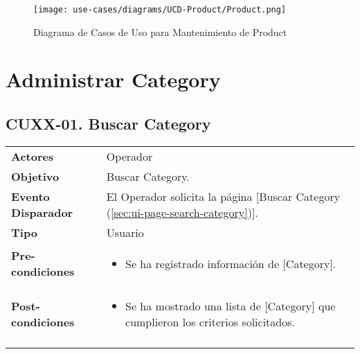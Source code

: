 	\begin{figure}[H]
		\begin{center}
		\label{tab:ucd-entity-product}
		\texttt{[image: use-cases/diagrams/UCD-Product/Product.png]}
		\caption{Diagrama de Casos de Uso para Mantenimiento de Product}
		\end{center}
	\end{figure}
	\clearpage
	\section{Administrar Category} \label{sec:cf-uc-admin-category}
	
	\subsection{CUXX-01. Buscar Category} \label{sec:cu-search-Category}
	
	\begin{tabular}{ p{3.5cm} p{11.5cm} }
		\textbf{Actores} & Operador\\
		\textbf{Objetivo} & Buscar Category.\\
		\textbf{Evento Disparador} & El Operador solicita la p\'agina [Buscar Category (\ref{sec:ui-page-search-category})].\\
		\textbf{Tipo} & Usuario\\
		\textbf{Pre-condiciones} &
			\begin{minipage}[t]{0.6\textwidth}
			\begin{itemize}[noitemsep,nolistsep]
			\setlength{\itemindent}{-.5cm}
				\item Se ha registrado informaci\'on de [Category].
			\end{itemize}
			\end{minipage} \\
		\textbf{Post-condiciones} &
			\begin{minipage}[t]{0.6\textwidth}
			\begin{itemize}[noitemsep,nolistsep]
			\setlength{\itemindent}{-.5cm}
				\item Se ha mostrado una lista de [Category] que cumplieron los criterios solicitados.
			\end{itemize}
			\end{minipage} \\
		\\
	\end{tabular}
	
